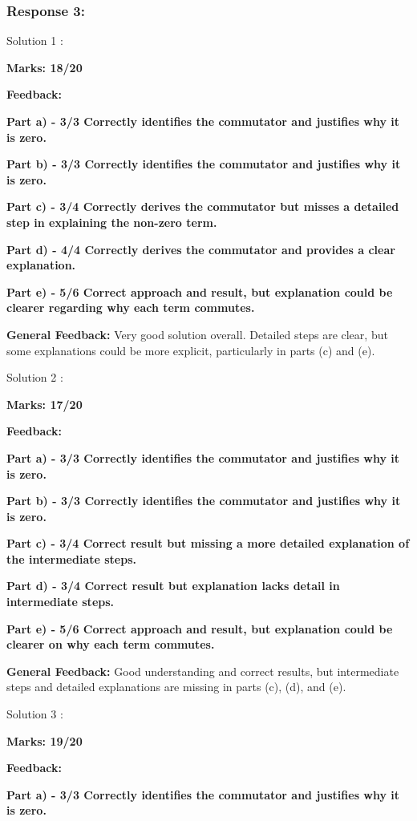 \documentclass[a4paper,11pt]{article}
\begin{document}
\subsubsection*{Response 3:}

Solution 1 :

\textbf{Marks: 18/20}

\textbf{Feedback:}

\textbf{Part a) - 3/3 Correctly identifies the commutator and justifies why it is zero.}

\textbf{Part b) - 3/3 Correctly identifies the commutator and justifies why it is zero.}

\textbf{Part c) - 3/4 Correctly derives the commutator but misses a detailed step in explaining the non-zero term.}

\textbf{Part d) - 4/4 Correctly derives the commutator and provides a clear explanation.}

\textbf{Part e) - 5/6 Correct approach and result, but explanation could be clearer regarding why each term commutes.}


\textbf{General Feedback:}
Very good solution overall. Detailed steps are clear, but some explanations could be more explicit, particularly in parts (c) and (e).


Solution 2 :

\textbf{Marks: 17/20}

\textbf{Feedback:}

\textbf{Part a) - 3/3 Correctly identifies the commutator and justifies why it is zero.}

\textbf{Part b) - 3/3 Correctly identifies the commutator and justifies why it is zero.}

\textbf{Part c) - 3/4 Correct result but missing a more detailed explanation of the intermediate steps.
}

\textbf{Part d) - 3/4 Correct result but explanation lacks detail in intermediate steps.}

\textbf{Part e) - 5/6 Correct approach and result, but explanation could be clearer on why each term commutes.}


\textbf{General Feedback:}
Good understanding and correct results, but intermediate steps and detailed explanations are missing in parts (c), (d), and (e).


Solution 3 :

\textbf{Marks: 19/20}

\textbf{Feedback:}

\textbf{Part a) - 3/3 Correctly identifies the commutator and justifies why it is zero.
}
\end{document}
